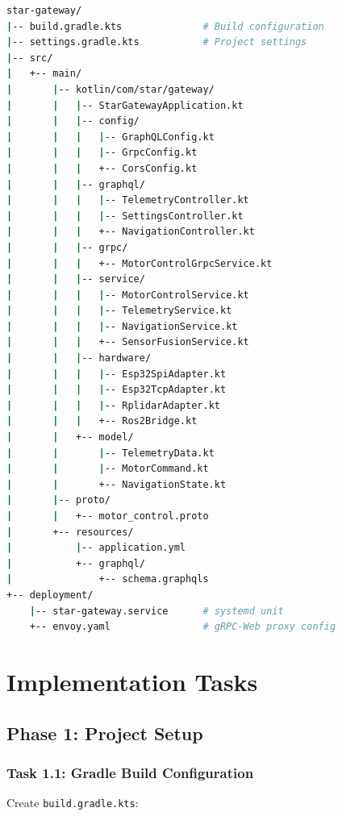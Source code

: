 \documentclass[11pt,letterpaper]{article}
\begin{document}
\begin{lstlisting}[language=bash]
star-gateway/
|-- build.gradle.kts              # Build configuration
|-- settings.gradle.kts           # Project settings
|-- src/
|   +-- main/
|       |-- kotlin/com/star/gateway/
|       |   |-- StarGatewayApplication.kt
|       |   |-- config/
|       |   |   |-- GraphQLConfig.kt
|       |   |   |-- GrpcConfig.kt
|       |   |   +-- CorsConfig.kt
|       |   |-- graphql/
|       |   |   |-- TelemetryController.kt
|       |   |   |-- SettingsController.kt
|       |   |   +-- NavigationController.kt
|       |   |-- grpc/
|       |   |   +-- MotorControlGrpcService.kt
|       |   |-- service/
|       |   |   |-- MotorControlService.kt
|       |   |   |-- TelemetryService.kt
|       |   |   |-- NavigationService.kt
|       |   |   +-- SensorFusionService.kt
|       |   |-- hardware/
|       |   |   |-- Esp32SpiAdapter.kt
|       |   |   |-- Esp32TcpAdapter.kt
|       |   |   |-- RplidarAdapter.kt
|       |   |   +-- Ros2Bridge.kt
|       |   +-- model/
|       |       |-- TelemetryData.kt
|       |       |-- MotorCommand.kt
|       |       +-- NavigationState.kt
|       |-- proto/
|       |   +-- motor_control.proto
|       +-- resources/
|           |-- application.yml
|           +-- graphql/
|               +-- schema.graphqls
+-- deployment/
    |-- star-gateway.service      # systemd unit
    +-- envoy.yaml                # gRPC-Web proxy config
\end{lstlisting}

\section{Implementation Tasks}

\subsection{Phase 1: Project Setup}

\subsubsection{Task 1.1: Gradle Build Configuration}

Create \texttt{build.gradle.kts}:
\end{document}
